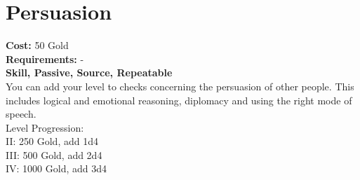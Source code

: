 \section{Persuasion}
\textbf{Cost:} 50 Gold\\
\textbf{Requirements:} -\\
\textbf{Skill, Passive, Source, Repeatable}\\
You can add your level to checks concerning the persuasion of other people. This includes logical and emotional reasoning, diplomacy and using the right mode of speech.
\\
Level Progression:\\
II: 250 Gold, add 1d4\\
III: 500 Gold, add 2d4\\
IV: 1000 Gold, add 3d4\\